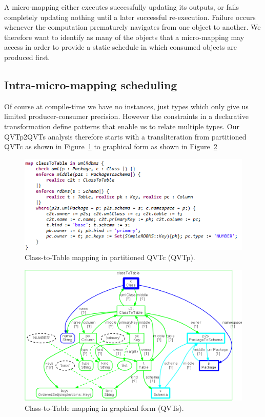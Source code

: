 \documentclass{llncs}
\begin{document}
A micro-mapping either executes successfully updating its outputs, or fails completely updating nothing until a later successful re-execution. Failure occurs whenever the computation prematurely navigates from one object to another. We therefore want to identify as many of the objects that a micro-mapping may access in order to provide a static schedule in which consumed objects are produced first. 

\subsection{Intra-micro-mapping scheduling}

Of course at compile-time we have no instances, just types which only give us limited producer-consumer precision. However the constraints in a declarative transformation define patterns that enable us to relate multiple types. Our QVTp2QVTs analysis therefore starts with a transliteration from partitioned QVTc as shown in Figure~\ref{fig:ClassToTable.qvtp} to graphical form as shown in Figure~\ref{fig:ClassToTable.qvts}

\begin{figure}[h]
	\centering
	\includegraphics[width=1.0\textwidth]{ClassToTable-qvtp.png}
	\caption{Class-to-Table mapping in partitioned QVTc (QVTp).}
	\label{fig:ClassToTable.qvtp}
\end{figure}

\begin{figure}[h]
	\centering
	\includegraphics[width=1.0\textwidth]{ClassToTable-qvts.png}
	\caption{Class-to-Table mapping in graphical form (QVTs).}
	\label{fig:ClassToTable.qvts}
\end{figure}
\end{document}
